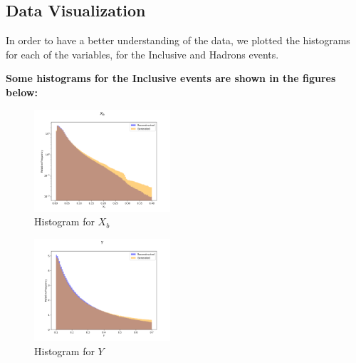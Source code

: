 \documentclass[EPJ,twocolumn]{webofc}
\begin{document}
\subsection{Data Visualization}
In order to have a better understanding of the data, we plotted the histograms for each of the variables, for the Inclusive and Hadrons events.

\textbf{Some histograms for the Inclusive events are shown in the figures below:}


\begin{figure}[H]
    \centering
    \includegraphics[width=0.45\textwidth]{graphs/incl_X_b.png}
    \caption{Histogram for $X_b$}
    \label{fig:incl_X_b}
\end{figure}

\begin{figure}[H]
    \centering
    \includegraphics[width=0.45\textwidth]{graphs/incl_Y.png}
    \caption{Histogram for $Y$}
    \label{fig:incl_Y}
\end{figure}



\end{document}
